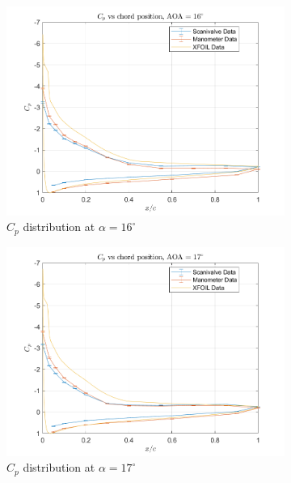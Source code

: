 \documentclass[runningheads]{llncs}
\begin{document}
\begin{figure}[h]
\begin{subfigure}[b]{0.3\textwidth}
        \includegraphics[width=\textwidth]{figures/AOA16.png}
        \caption{$C_p$ distribution at $\alpha = 16^\circ$}
        \label{fig:cp_16}
    \end{subfigure}
    \begin{subfigure}[b]{0.3\textwidth}
        \centering
        \includegraphics[width=\textwidth]{figures/AOA17.png}
        \caption{$C_p$ distribution at $\alpha = 17^\circ$}
        \label{fig:cp_17}
    \end{subfigure}
    \begin{subfigure}[b]{0.3\textwidth}
        \centering

\end{subfigure}
\end{figure}
\end{document}
